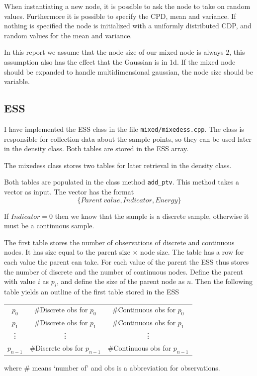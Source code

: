\documentclass[10pt, conference, compsocconf,a4paper]{IEEEtran}
\begin{document}
When instantiating a new node, it is possible to ask the node to take on random values. Furthermore it is possible to specify the CPD, mean and variance. If nothing is specified the node is initialized with a uniformly distributed CDP, and random values for the mean and variance. 

In this report we assume that the node size of our mixed node is always $2$, this assumption also has the effect that the Gaussian is in 1d. If the mixed node should be expanded to handle multidimensional gaussian, the node size should be variable.


\subsection{ESS} %
\label{sub:ess}
I have implemented the ESS class in the file \texttt{mixed/mixedess.cpp}. The class is responsible for collection data about the sample points, so they can be used later in the density class. Both tables are stored in the ESS array.

The mixedess class stores two tables for later retrieval in the density class. 

Both tables are populated in the class method \texttt{add\_ptv}. This method takes a vector as input. The vector has the format
\begin{equation}
  \{Parent\ value, Indicator, Energy\}
\end{equation}

If $Indicator=0$ then we know that the sample is a discrete sample, otherwise it must be a continuous sample.

The first table stores the number of observations of discrete and continuous nodes. It has size equal to the parent size $\times$ node size. The table has a row for each value the parent can take. For each value of the parent the ESS thus stores the number of discrete and the number of continuous nodes. Define the parent with value $i$ as $p_i$, and define the size of the parent node as $n$. Then the following table yields an outline of the first table stored in the ESS
\begin{center}
  \begin{tabular}{c | c | c}
  $p_0$ & \#Discrete obs for $p_0$ & \#Continuous obs for $p_0$ \\
  $p_1$ & \#Discrete obs for $p_1$ & \#Continuous obs for $p_1$ \\
  \vdots & \vdots & \vdots \\
  $p_{n-1}$ & \#Discrete obs for $p_{n-1}$ & \#Continuous obs for $p_{n-1}$ 
  \end{tabular}  
\end{center}
where \# means `number of' and obs is a abbreviation for observations.
\end{document}
